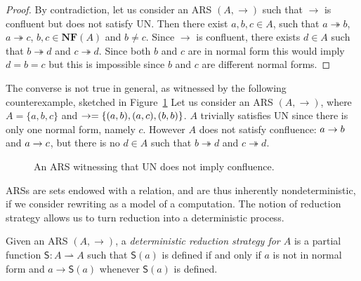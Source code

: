 \begin{proof}
	By contradiction, let us consider an ARS $(A,\rightarrow)$ such that $\rightarrow$ is confluent but does not satisfy UN. Then there exist $a,b,c\in A$, such that $a\twoheadrightarrow b$, $a\twoheadrightarrow c$, $b,c\in\mathbf{NF}(A)$ and $b\neq c$. Since $\rightarrow$ is confluent, there exists $d\in A$ such that $b\twoheadrightarrow d$ and $c\twoheadrightarrow d$. Since both $b$ and $c$ are in normal form this would imply $d= b= c$ but this is impossible since $b$ and $c$ are different normal forms.
\end{proof}
The converse is not true in general, as witnessed by the following counterexample, sketched in Figure~\ref{figure:counterexample2} Let us consider an ARS $(A,\rightarrow)$, where $A=\{a,b,c\}$ and $\rightarrow=\{(a,b),(a,c),(b,b)\}$. $A$ trivially satisfies UN since there is only one normal form, namely $c$. However $A$ does not satisfy confluence: $a\rightarrow b$ and $a\rightarrow c$, but there is no $d\in A$ such that $b\twoheadrightarrow d$ and $c\twoheadrightarrow d$.\\
\begin{figure}
		\caption{An ARS witnessing that UN does not imply confluence.}
		\label{figure:counterexample2}
	\end{figure}
ARSs are sets endowed with a relation, and are thus
inherently nondeterministic, if we consider rewriting as a model of a computation. The notion of reduction strategy allows us to turn reduction into a deterministic process.
\begin{definition}\label{def:determstrat}
	Given an ARS $(A,\rightarrow)$, a \emph{deterministic reduction
		strategy for $A$} is a partial function $\mathsf{S}:A\rightharpoonup A$
	such that $\mathsf{S}(a)$ is defined if and only if $a$ is not in
	normal form and $a\rightarrow\mathsf{S}(a)$ whenever $\mathsf{S}(a)$
	is defined.
\end{definition}
